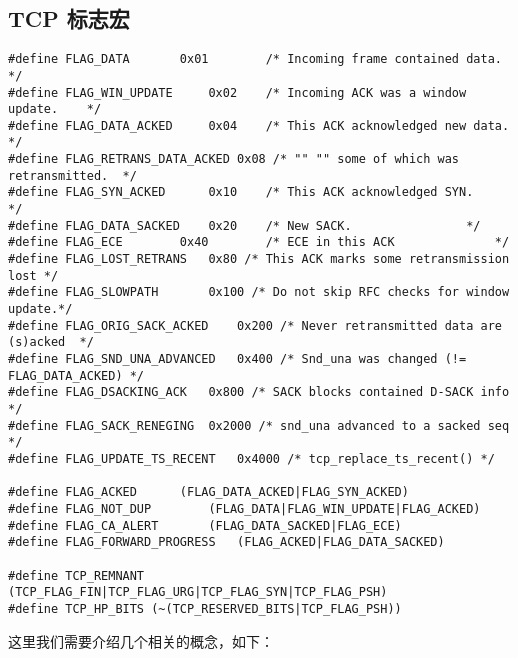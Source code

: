     \subsection{TCP 标志宏}
\begin{verbatim}
#define FLAG_DATA       0x01        /* Incoming frame contained data.       */
#define FLAG_WIN_UPDATE     0x02    /* Incoming ACK was a window update.    */
#define FLAG_DATA_ACKED     0x04    /* This ACK acknowledged new data.      */
#define FLAG_RETRANS_DATA_ACKED 0x08 /* "" "" some of which was retransmitted.  */
#define FLAG_SYN_ACKED      0x10    /* This ACK acknowledged SYN.       */
#define FLAG_DATA_SACKED    0x20    /* New SACK.                */
#define FLAG_ECE        0x40        /* ECE in this ACK              */
#define FLAG_LOST_RETRANS   0x80 /* This ACK marks some retransmission lost */
#define FLAG_SLOWPATH       0x100 /* Do not skip RFC checks for window update.*/
#define FLAG_ORIG_SACK_ACKED    0x200 /* Never retransmitted data are (s)acked  */
#define FLAG_SND_UNA_ADVANCED   0x400 /* Snd_una was changed (!= FLAG_DATA_ACKED) */
#define FLAG_DSACKING_ACK   0x800 /* SACK blocks contained D-SACK info */
#define FLAG_SACK_RENEGING  0x2000 /* snd_una advanced to a sacked seq */
#define FLAG_UPDATE_TS_RECENT   0x4000 /* tcp_replace_ts_recent() */

#define FLAG_ACKED      (FLAG_DATA_ACKED|FLAG_SYN_ACKED)
#define FLAG_NOT_DUP        (FLAG_DATA|FLAG_WIN_UPDATE|FLAG_ACKED)
#define FLAG_CA_ALERT       (FLAG_DATA_SACKED|FLAG_ECE)
#define FLAG_FORWARD_PROGRESS   (FLAG_ACKED|FLAG_DATA_SACKED)

#define TCP_REMNANT (TCP_FLAG_FIN|TCP_FLAG_URG|TCP_FLAG_SYN|TCP_FLAG_PSH)
#define TCP_HP_BITS (~(TCP_RESERVED_BITS|TCP_FLAG_PSH))
\end{verbatim}

            这里我们需要介绍几个相关的概念，如下：

